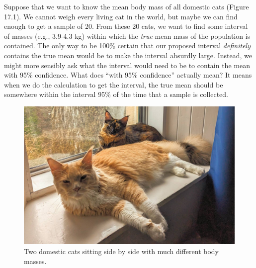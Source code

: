 \documentclass[
]{scrbook}
\begin{document}
Suppose that we want to know the mean body mass of all domestic cats (Figure 17.1).
We cannot weigh every living cat in the world, but maybe we can find enough to get a sample of 20.
From these 20 cats, we want to find some interval of masses (e.g., 3.9-4.3 kg) within which the \emph{true} mean mass of the population is contained.
The only way to be 100\% certain that our proposed interval \emph{definitely} contains the true mean would be to make the interval absurdly large.
Instead, we might more sensibly ask what the interval would need to be to contain the mean with 95\% confidence.
What does ``with 95\% confidence'' actually mean?
It means when we do the calculation to get the interval, the true mean should be somewhere within the interval 95\% of the time that a sample is collected.

\begin{figure}
\includegraphics[width=1\linewidth]{img/housecats} \caption{Two domestic cats sitting side by side with much different body masses.}\label{fig:unnamed-chunk-82}
\end{figure}
\end{document}
